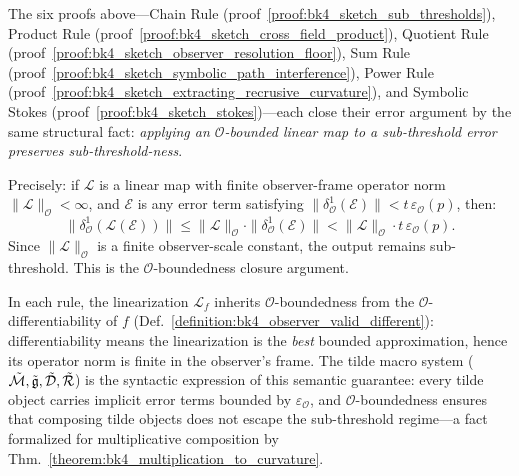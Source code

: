 \begin{scholium}
\label{scholium:bk4_o_boundedness_unifying_principle}
The six proofs above---Chain Rule
(proof~\ref{proof:bk4_sketch_sub_thresholds}),
Product Rule
(proof~\ref{proof:bk4_sketch_cross_field_product}),
Quotient Rule
(proof~\ref{proof:bk4_sketch_observer_resolution_floor}),
Sum Rule
(proof~\ref{proof:bk4_sketch_symbolic_path_interference}),
Power Rule
(proof~\ref{proof:bk4_sketch_extracting_recrusive_curvature}),
and Symbolic Stokes
(proof~\ref{proof:bk4_sketch_stokes})---each close their error argument by the
same structural fact: \emph{applying an $\mathcal{O}$-bounded linear map to a
sub-threshold error preserves sub-threshold-ness}.

Precisely: if $\mathcal{L}$ is a linear map with finite observer-frame operator
norm $\|\mathcal{L}\|_{\mathcal{O}} < \infty$, and $\mathcal{E}$ is any error term
satisfying $\|\delta^1_{\mathcal{O}}(\mathcal{E})\| < t\,\varepsilon_{\mathcal{O}}(p)$,
then:
\[
\|\delta^1_{\mathcal{O}}(\mathcal{L}(\mathcal{E}))\| \leq \|\mathcal{L}\|_{\mathcal{O}}\cdot\|\delta^1_{\mathcal{O}}(\mathcal{E})\| < \|\mathcal{L}\|_{\mathcal{O}}\cdot t\,\varepsilon_{\mathcal{O}}(p).
\]
Since $\|\mathcal{L}\|_{\mathcal{O}}$ is a finite observer-scale constant, the output
remains sub-threshold. This is the $\mathcal{O}$-boundedness closure argument.

In each rule, the linearization $\mathcal{L}_f$ inherits $\mathcal{O}$-boundedness
from the $\mathcal{O}$-differentiability of $f$ (Def.~\ref{definition:bk4_observer_valid_different}):
differentiability means the linearization is the \emph{best} bounded approximation,
hence its operator norm is finite in the observer's frame. The tilde macro system
($\tilde{\mathcal{M}}, \tilde{\mathfrak{g}}, \tilde{\mathcal{D}}, \tilde{\mathcal{R}}$) is the syntactic expression of this semantic guarantee: every
tilde object carries implicit error terms bounded by $\varepsilon_{\mathcal{O}}$, and
$\mathcal{O}$-boundedness ensures that composing tilde objects does not escape the
sub-threshold regime---a fact formalized for multiplicative composition by
Thm.~\ref{theorem:bk4_multiplication_to_curvature}.


\end{scholium}
